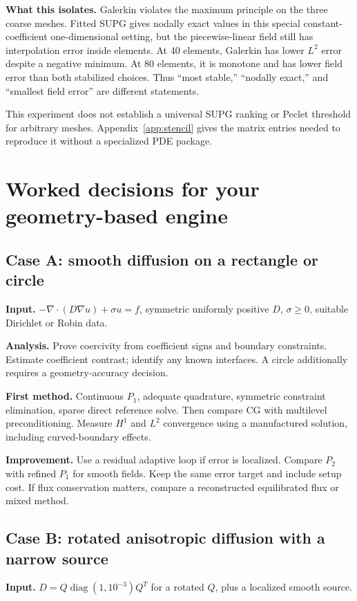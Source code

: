 \documentclass[11pt,a4paper]{article}
\begin{document}
\textbf{What this isolates.} Galerkin violates the maximum principle on the three coarse meshes. Fitted SUPG gives nodally exact values in this special constant-coefficient one-dimensional setting, but the piecewise-linear field still has interpolation error inside elements. At 40 elements, Galerkin has lower $L^2$ error despite a negative minimum. At 80 elements, it is monotone and has lower field error than both stabilized choices. Thus ``most stable,'' ``nodally exact,'' and ``smallest field error'' are different statements.

This experiment does not establish a universal SUPG ranking or Peclet threshold for arbitrary meshes. Appendix~\ref{app:stencil} gives the matrix entries needed to reproduce it without a specialized PDE package.

\section{Worked decisions for your geometry-based engine}\label{sec:cases}
\subsection{Case A: smooth diffusion on a rectangle or circle}
\textbf{Input.} $-\nabla\cdot(D\nabla u)+\sigma u=f$, symmetric uniformly positive $D$, $\sigma\ge0$, suitable Dirichlet or Robin data.

\textbf{Analysis.} Prove coercivity from coefficient signs and boundary constraints. Estimate coefficient contrast; identify any known interfaces. A circle additionally requires a geometry-accuracy decision.

\textbf{First method.} Continuous $P_1$, adequate quadrature, symmetric constraint elimination, sparse direct reference solve. Then compare CG with multilevel preconditioning. Measure $H^1$ and $L^2$ convergence using a manufactured solution, including curved-boundary effects.

\textbf{Improvement.} Use a residual adaptive loop if error is localized. Compare $P_2$ with refined $P_1$ for smooth fields. Keep the same error target and include setup cost. If flux conservation matters, compare a reconstructed equilibrated flux or mixed method.

\subsection{Case B: rotated anisotropic diffusion with a narrow source}
\textbf{Input.} $D=Q\operatorname{diag}(1,10^{-3})Q^T$ for a rotated $Q$, plus a localized smooth source.
\end{document}
